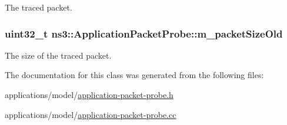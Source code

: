 The traced packet. 

\subsubsection[{\texorpdfstring{m\+\_\+packet\+Size\+Old}{m_packetSizeOld}}]{\setlength{\rightskip}{0pt plus 5cm}uint32\+\_\+t ns3\+::\+Application\+Packet\+Probe\+::m\+\_\+packet\+Size\+Old\hspace{0.3cm}{\ttfamily [private]}}\hypertarget{classns3_1_1ApplicationPacketProbe_ad3ecd81e5fbd3b867eb1f46c5e8cfddb}{}\label{classns3_1_1ApplicationPacketProbe_ad3ecd81e5fbd3b867eb1f46c5e8cfddb}


The size of the traced packet. 



The documentation for this class was generated from the following files\+:\begin{DoxyCompactItemize}
\item 
applications/model/\hyperlink{application-packet-probe_8h}{application-\/packet-\/probe.\+h}\item 
applications/model/\hyperlink{application-packet-probe_8cc}{application-\/packet-\/probe.\+cc}\end{DoxyCompactItemize}
